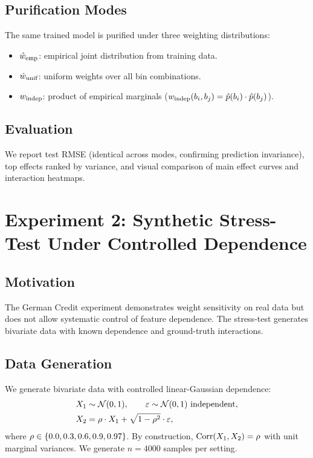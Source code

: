 \subsection{Purification Modes}

The same trained model is purified under three weighting distributions:
\begin{itemize}
    \item $\hat{w}_{\mathrm{emp}}$: empirical joint distribution from training data.
    \item $\hat{w}_{\mathrm{unif}}$: uniform weights over all bin combinations.
    \item $w_{\mathrm{indep}}$: product of empirical marginals ($w_{\mathrm{indep}}(b_i, b_j) = \hat{p}(b_i) \cdot \hat{p}(b_j)$).
\end{itemize}

\subsection{Evaluation}

We report test \gls{RMSE} (identical across modes, confirming prediction invariance), top effects ranked by variance, and visual comparison of main effect curves and interaction heatmaps.

\section{Experiment 2: Synthetic Stress-Test Under Controlled Dependence}\label{sec:exp-stress}

\subsection{Motivation}

The German Credit experiment demonstrates weight sensitivity on real data but does not allow systematic control of feature dependence.
The stress-test generates bivariate data with known dependence and ground-truth interactions.

\subsection{Data Generation}

We generate bivariate data with controlled linear-Gaussian dependence:
\begin{align}
    X_1 &\sim \mathcal{N}(0, 1), \qquad \varepsilon \sim \mathcal{N}(0, 1) \text{ independent}, \\
    X_2 &= \rho \cdot X_1 + \sqrt{1 - \rho^2} \cdot \varepsilon,
\end{align}
where $\rho \in \{0.0, 0.3, 0.6, 0.9, 0.97\}$.
By construction, $\text{Corr}(X_1, X_2) = \rho$ with unit marginal variances.
We generate $n = 4000$ samples per setting.

